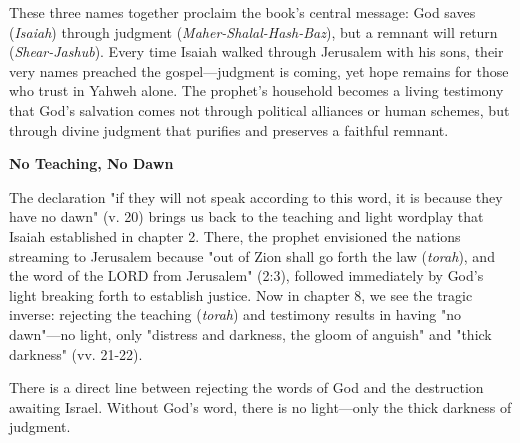 \documentclass[11pt]{article}
\begin{document}


\vspace{1em}
These three names together proclaim the book's central message: God saves (\textit{Isaiah}) through judgment (\textit{Maher-Shalal-Hash-Baz}), but a remnant will return (\textit{Shear-Jashub}). Every time Isaiah walked through Jerusalem with his sons, their very names preached the gospel—judgment is coming, yet hope remains for those who trust in Yahweh alone. The prophet's household becomes a living testimony that God's salvation comes not through political alliances or human schemes, but through divine judgment that purifies and preserves a faithful remnant.

\vspace{3em}
{\large\bfseries No Teaching, No Dawn}
\vspace{1em}

The declaration "if they will not speak according to this word, it is because they have no dawn" (v. 20) brings us back to the teaching and light wordplay that Isaiah established in chapter 2. There, the prophet envisioned the nations streaming to Jerusalem because "out of Zion shall go forth the law (\textit{torah}), and the word of the LORD from Jerusalem" (2:3), followed immediately by God's light breaking forth to establish justice. Now in chapter 8, we see the tragic inverse: rejecting the teaching (\textit{torah}) and testimony results in having "no dawn"—no light, only "distress and darkness, the gloom of anguish" and "thick darkness" (vv. 21-22).

\vspace{1em}
There is a direct line between rejecting the words of God and the destruction awaiting Israel. Without God's word, there is no light—only the thick darkness of judgment.
\end{document}
